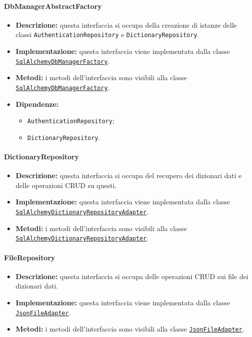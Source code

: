 \paragraph{DbManagerAbstractFactory} \label{DbManagerAbstractFactory}
\begin{itemize}
    \item \textbf{Descrizione:} questa interfaccia si occupa della creazione di istanze delle classi \texttt{AuthenticationRepository} e \texttt{DictionaryRepository}.
    \item \textbf{Implementazione:} questa interfaccia viene implementata dalla classe \hyperref[SqlAlchemyDbManagerFactory]{\texttt{SqlAlchemyDbManagerFactory}}.
    \item \textbf{Metodi:} i metodi dell'interfaccia sono visibili alla classe \hyperref[SqlAlchemyDbManagerFactory]{\texttt{SqlAlchemyDbManagerFactory}}.
    \item \textbf{Dipendenze:}
    \begin{itemize}
        \item \texttt{AuthenticationRepository};
        \item \texttt{DictionaryRepository}.
    \end{itemize}
\end{itemize} 

\paragraph{DictionaryRepository} \label{DictionaryRepository}
\begin{itemize}
    \item \textbf{Descrizione:} questa interfaccia si occupa del recupero dei dizionari dati e delle operazioni CRUD su questi.
    \item \textbf{Implementazione:} questa interfaccia viene implementata dalla classe \hyperref[SqlAlchemyDictionaryRepositoryAdapter]{\texttt{SqlAlchemyDictionaryRepositoryAdapter}}.
    \item \textbf{Metodi:} i metodi dell'interfaccia sono visibili alla classe \hyperref[SqlAlchemyDictionaryRepositoryAdapter]{\texttt{SqlAlchemyDictionaryRepositoryAdapter}}.
\end{itemize} 

\paragraph{FileRepository} \label{FileRepository}
\begin{itemize}
    \item \textbf{Descrizione:} questa interfaccia si occupa delle operazioni CRUD sui file dei dizionari dati.
    \item \textbf{Implementazione:} questa interfaccia viene implementata dalla classe \hyperref[JsonFileAdapter]{\texttt{JsonFileAdapter}}.
    \item \textbf{Metodi:} i metodi dell'interfaccia sono visibili alla classe \hyperref[JsonFileAdapter]{\texttt{JsonFileAdapter}}.
\end{itemize}  

